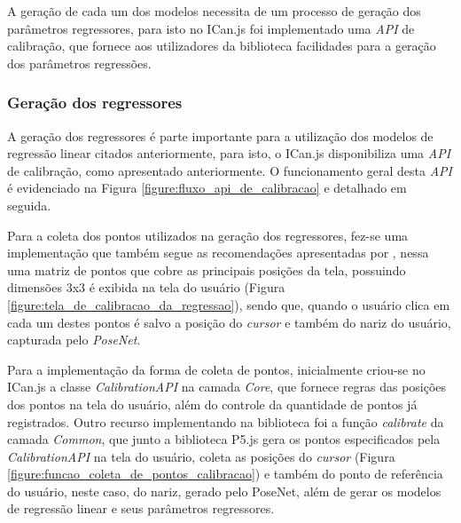 \par A geração de cada um dos modelos necessita de um processo de geração dos parâmetros regressores, para isto no ICan.js foi implementado uma \textit{API} de calibração, que fornece aos utilizadores da biblioteca facilidades para a geração dos parâmetros regressões.

\subsubsection{Geração dos regressores}

\par A geração dos regressores é parte importante para a utilização dos modelos de regressão linear citados anteriormente, para isto, o ICan.js disponibiliza uma \textit{API} de calibração, como apresentado anteriormente. O funcionamento geral desta \textit{API} é evidenciado na Figura \ref{figure:fluxo_api_de_calibracao} e detalhado em seguida.


\par Para a coleta dos pontos utilizados na geração dos regressores, fez-se uma implementação que também segue as recomendações apresentadas por , nessa uma matriz de pontos que cobre as principais posições da tela, possuindo dimensões 3x3 é exibida na tela do usuário (Figura \ref{figure:tela_de_calibracao_da_regressao}), sendo que, quando o usuário clica em cada um destes pontos é salvo a posição do \textit{cursor} e também do nariz do usuário, capturada pelo \textit{PoseNet}.


\par Para a implementação da forma de coleta de pontos, inicialmente criou-se no ICan.js a classe \textit{CalibrationAPI} na camada \textit{Core}, que fornece regras das posições dos pontos na tela do usuário, além do controle da quantidade de pontos já registrados. Outro recurso implementando na biblioteca foi a função \textit{calibrate} da camada \textit{Common}, que junto a biblioteca P5.js gera os pontos especificados pela \textit{CalibrationAPI} na tela do usuário, coleta as posições do \textit{cursor} (Figura \ref{figure:funcao_coleta_de_pontos_calibracao}) e também do ponto de referência do usuário, neste caso, do nariz, gerado pelo PoseNet, além de gerar os modelos de regressão linear e seus parâmetros regressores.

